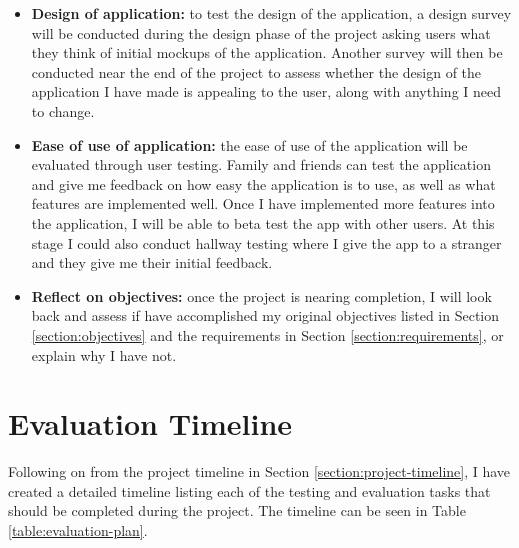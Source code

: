 \begin{itemize}
  \item \textbf{Design of application:} to test the design of the application, a design survey will be conducted during the design phase of the project asking users what they think of initial mockups of the application. Another survey will then be conducted near the end of the project to assess whether the design of the application I have made is appealing to the user, along with anything I need to change.
  \item \textbf{Ease of use of application:} the ease of use of the application will be evaluated through user testing. Family and friends can test the application and give me feedback on how easy the application is to use, as well as what features are implemented well. Once I have implemented more features into the application, I will be able to beta test the app with other users. At this stage I could also conduct hallway testing where I give the app to a stranger and they give me their initial feedback.
  \item \textbf{Reflect on objectives:} once the project is nearing completion, I will look back and assess if have accomplished my original objectives listed in Section \ref{section:objectives} and the requirements in Section \ref{section:requirements}, or explain why I have not.
\end{itemize}

\section{Evaluation Timeline}

Following on from the project timeline in Section \ref{section:project-timeline}, I have created a detailed timeline listing each of the testing and evaluation tasks that should be completed during the project. The timeline can be seen in Table \ref{table:evaluation-plan}.

